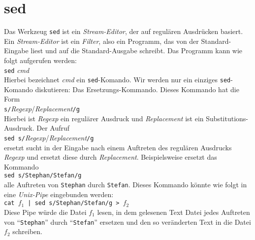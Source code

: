 \section{sed}
Das Werkzeug \texttt{sed} ist ein \emph{Stream-Editor}, der auf regul\"aren Ausdr\"ucken
basiert.  Ein \emph{Stream-Editor} ist ein \emph{Filter}, also ein Programm, das von der
Standard-Eingabe liest und auf die Standard-Ausgabe schreibt.  Das Programm kann
wie folgt aufgerufen werden:
\\[0.2cm]
\hspace*{1.3cm}
\texttt{sed} \textsl{cmd}
\\[0.2cm]
Hierbei bezeichnet \textsl{cmd} ein \texttt{sed}-Komando.  Wir werden nur ein einziges
\texttt{sed}-Komando diskutieren: Das Ersetzungs-Kommando.  Dieses Kommando hat die Form
\\[0.2cm]
\hspace*{1.3cm}
\texttt{s/}\textsl{Regexp}/\textsl{Replacement}\texttt{/g}
\\[0.2cm]
Hierbei ist \textsl{Regexp} ein regul\"arer Ausdruck und \textsl{Replacement} ist ein
Substitutions-Ausdruck.  Der Aufruf
\\[0.2cm]
\hspace*{1.3cm}
\texttt{sed s/}\textsl{Regexp}/\textsl{Replacement}\texttt{/g}
\\[0.2cm]
ersetzt sucht in der Eingabe nach einem Auftreten des regul\"aren Ausdrucks \textsl{Regexp}
und ersetzt diese durch \textsl{Replacement}.  Beispielsweise ersetzt das Kommando 
\\[0.2cm]
\hspace*{1.3cm}
\texttt{sed s/Stephan/Stefan/g}
\\[0.2cm]
alle Auftreten von \texttt{Stephan} durch \texttt{Stefan}.  Dieses Kommando
k\"onnte wie folgt in eine \emph{Unix-Pipe} eingebunden werden:
\\[0.2cm]
\hspace*{1.3cm}
\texttt{cat $f_1$ | sed s/Stephan/Stefan/g > $f_2$} 
\\[0.2cm]
Diese Pipe w\"urde die Datei $f_1$ lesen, in dem gelesenen Text Datei jedes Auftreten von
``\texttt{Stephan}'' durch ``\texttt{Stefan}'' ersetzen und den so ver\"anderten Text in die
Datei $f_2$ schreiben.

